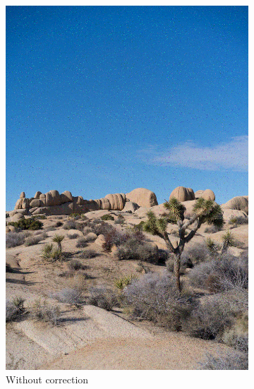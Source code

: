 \documentclass{article}
\begin{document}
\begin{figure}[htb]
\begin{subfigure}[b]{0.32\textwidth}
        \includegraphics[width=\textwidth]{../Result/cyclic-bsc-output.png}
        \caption{Without correction}
        \label{fig:image-cyclic-bsc-no-correction}
    \end{subfigure}
    \hfill
    \begin{subfigure}[b]{0.32\textwidth}
        \centering

\end{subfigure}
\end{figure}
\end{document}
